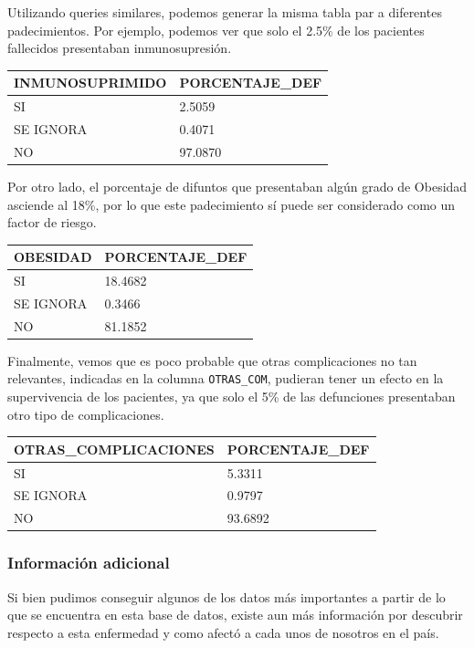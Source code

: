\documentclass[11pt]{article}
\begin{document}
Utilizando queries similares, podemos generar la misma tabla par a
diferentes padecimientos. Por ejemplo, podemos ver que solo el 2.5\% de
los pacientes fallecidos presentaban inmunosupresión.

\begin{longtable}[]{@{}ll@{}}
\toprule\noalign{}
INMUNOSUPRIMIDO & PORCENTAJE\_DEF \\
\midrule\noalign{}
\endhead
\bottomrule\noalign{}
\endlastfoot
SI & 2.5059 \\
SE IGNORA & 0.4071 \\
NO & 97.0870 \\
\end{longtable}

Por otro lado, el porcentaje de difuntos que presentaban algún grado de
Obesidad asciende al 18\%, por lo que este padecimiento sí puede ser
considerado como un factor de riesgo.

\begin{longtable}[]{@{}ll@{}}
\toprule\noalign{}
OBESIDAD & PORCENTAJE\_DEF \\
\midrule\noalign{}
\endhead
\bottomrule\noalign{}
\endlastfoot
SI & 18.4682 \\
SE IGNORA & 0.3466 \\
NO & 81.1852 \\
\end{longtable}

Finalmente, vemos que es poco probable que otras complicaciones no tan
relevantes, indicadas en la columna \texttt{OTRAS\_COM}, pudieran tener
un efecto en la supervivencia de los pacientes, ya que solo el 5\% de
las defunciones presentaban otro tipo de complicaciones.

\begin{longtable}[]{@{}ll@{}}
\toprule\noalign{}
OTRAS\_COMPLICACIONES & PORCENTAJE\_DEF \\
\midrule\noalign{}
\endhead
\bottomrule\noalign{}
\endlastfoot
SI & 5.3311 \\
SE IGNORA & 0.9797 \\
NO & 93.6892 \\
\end{longtable}

\hypertarget{informaciuxf3n-adicional}{%
\subsubsection{Información adicional}\label{informaciuxf3n-adicional}}

Si bien pudimos conseguir algunos de los datos más importantes a partir
de lo que se encuentra en esta base de datos, existe aun más información
por descubrir respecto a esta enfermedad y como afectó a cada unos de
nosotros en el país.
\end{document}
